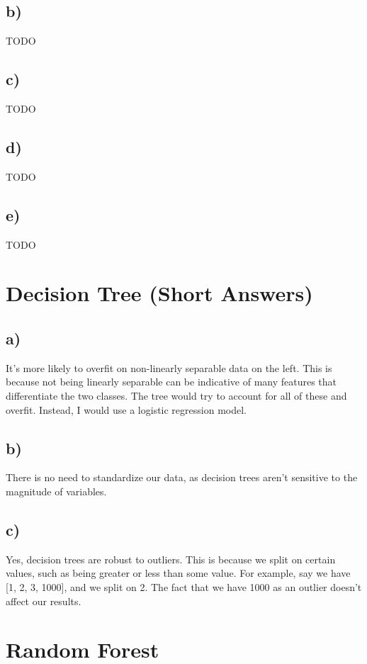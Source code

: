 \documentclass[12pt, letterpaper]{article}
\begin{document}
\subsection*{b)} TODO

\subsection*{c)} TODO

\subsection*{d)} TODO

\subsection*{e)} TODO


\newpage
\section{Decision Tree (Short Answers)}
\subsection*{a)} It's more likely to overfit on non-linearly separable data on the left. This is because not being linearly separable can be indicative of many features that differentiate the two classes. The tree would try to account for all of these and overfit. Instead, I would use a logistic regression model.

\subsection*{b)}There is no need to standardize our data, as decision trees aren't sensitive to the magnitude of variables.

\subsection*{c)}Yes, decision trees are robust to outliers. This is because we split on certain values, such as being greater or less than some value. For example, say we have [1, 2, 3, 1000], and we split on 2. The fact that we have 1000 as an outlier doesn't affect our results.

\newpage
\section{Random Forest}
\end{document}
